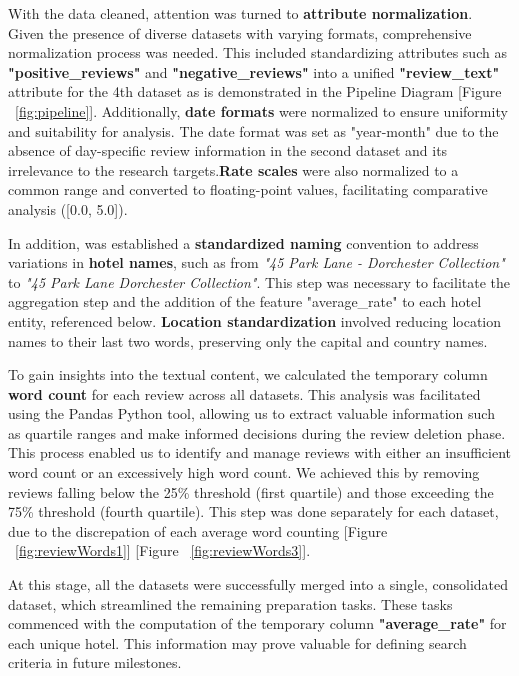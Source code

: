 \documentclass[sigconf]{acmart}
\begin{document}
With the data cleaned, attention was turned to \textbf{attribute normalization}. Given the presence of diverse datasets with varying formats, comprehensive normalization process was needed. This included standardizing attributes such as \textbf{"positive\_reviews"} and \textbf{"negative\_reviews"} into a unified \textbf{"review\_text"} attribute for the 4th dataset as is demonstrated in the Pipeline Diagram [Figure ~\ref{fig:pipeline}]. Additionally, \textbf{date formats} were normalized to ensure uniformity and suitability for analysis. The date format was set as "year-month" due to the absence of day-specific review information in the second dataset and its irrelevance to the research targets.\textbf{Rate scales} were also normalized to a common range and converted to floating-point values, facilitating comparative analysis ([0.0, 5.0]).

In addition, was established a \textbf{standardized naming} convention to address variations in \textbf{hotel names}, such as from \textit{"45 Park Lane - Dorchester Collection"} to \textit{"45 Park Lane Dorchester Collection"}. This step was necessary to facilitate the aggregation step and the addition of the feature "average\_rate" to each hotel entity, referenced below. \textbf{Location standardization} involved reducing location names to their last two words, preserving only the capital and country names.

To gain insights into the textual content, we calculated the temporary column \textbf{word count} for each review across all datasets. This analysis was facilitated using the Pandas \cite{Pandas} Python tool, allowing us to extract valuable information such as quartile ranges and make informed decisions during the review deletion phase. This process enabled us to identify and manage reviews with either an insufficient word count or an excessively high word count. We achieved this by removing reviews falling below the 25\% threshold (first quartile) and those exceeding the 75\% threshold (fourth quartile). This step was done separately for each dataset, due to the discrepation of each average word counting [Figure ~\ref{fig:reviewWords1}] [Figure ~\ref{fig:reviewWords3}].

At this stage, all the datasets were successfully merged into a single, consolidated dataset, which streamlined the remaining preparation tasks. These tasks commenced with the computation of the temporary column \textbf{"average\_rate"} for each unique hotel. This information may prove valuable for defining search criteria in future milestones.
\end{document}
